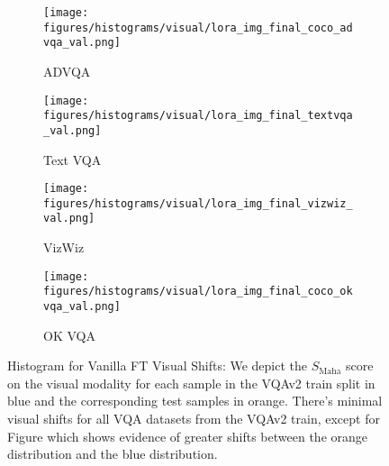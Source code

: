 \begin{figure*}[!h]
    \vspace{0.5cm} %

    \begin{subfigure}[b]{0.3\linewidth}
        \centering
        \texttt{[image: figures/histograms/visual/lora\_img\_final\_coco\_advqa\_val.png]}
        \caption{ADVQA}
        \label{fig:vadvqa}
    \end{subfigure}
    \hfill
    \begin{subfigure}[b]{0.3\linewidth}
        \centering
        \texttt{[image: figures/histograms/visual/lora\_img\_final\_textvqa\_val.png]}
        \caption{Text VQA}
        \label{fig:vtextvqa}
    \end{subfigure}
    \hfill
    \begin{subfigure}[b]{0.3\linewidth}
        \centering
        \texttt{[image: figures/histograms/visual/lora\_img\_final\_vizwiz\_val.png]}
        \caption{VizWiz}
        \label{fig:vvizwiz}
    \end{subfigure}

    \vspace{0.5cm} %

    \begin{subfigure}[b]{0.3\linewidth}
        \centering
        \texttt{[image: figures/histograms/visual/lora\_img\_final\_coco\_okvqa\_val.png]}
        \caption{OK VQA}
        \label{fig:vokvqa}
    \end{subfigure}
    \caption{Histogram for Vanilla FT Visual Shifts: We depict the \( S_{\text{Maha}} \) score on the visual modality for each sample in the VQAv2 train split in blue and the corresponding test samples in orange. There's minimal visual shifts for all VQA datasets from the VQAv2 train, except for Figure  which shows evidence of greater shifts between the orange distribution and the blue distribution. }
    \label{fig:v_histograms}
\end{figure*}



